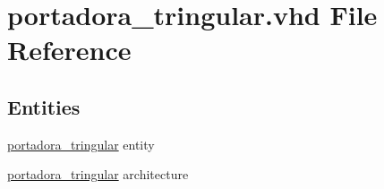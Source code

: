 \hypertarget{portadora__tringular_8vhd}{}\section{portadora\+\_\+tringular.\+vhd File Reference}
\label{portadora__tringular_8vhd}
\subsection*{Entities}
\begin{DoxyCompactItemize}
\item 
\hyperlink{classportadora__tringular}{portadora\+\_\+tringular} entity
\item 
\hyperlink{classportadora__tringular_1_1portadora__tringular}{portadora\+\_\+tringular} architecture
\end{DoxyCompactItemize}
